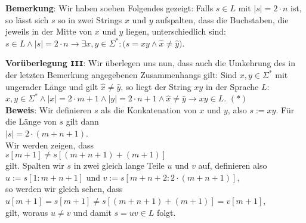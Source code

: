 \noindent
\textbf{Bemerkung}: Wir haben soeben Folgendes gezeigt:  Falls $s \in L$ mit $|s| = 2 \cdot n$ ist, so l\"asst
sich $s$ so in zwei Strings $x$ und $y$ aufspalten, dass die Buchstaben, die jeweils in
der Mitte von $x$ und $y$ liegen, unterschiedlich sind:
\\[0.2cm]
\hspace*{1.3cm}
$s \in L \wedge |s| = 2 \cdot n \rightarrow \exists x,y \in \Sigma^*: \bigl(
 s = xy \wedge \hat{x} \not= \hat{y}\bigr)$.
\vspace{0.3cm}

\noindent
\textbf{Vor\"uberlegung \texttt{III}}:
Wir \"uberlegen uns nun, dass auch die Umkehrung des in der letzten Bemerkung angegebenen
Zusammenhangs gilt:  Sind $x, y \in \Sigma^*$ mit ungerader L\"ange und gilt 
$\hat{x} \not= \hat{y}$, so liegt der String $xy$ in der Sprache $L$:
\\[0.2cm]
\hspace*{1.3cm}
$x, y \in \Sigma^* \wedge |x| = 2 \cdot m + 1 \wedge |y| = 2 \cdot n + 1 \wedge \hat{x}
\not= \hat{y} \rightarrow xy \in L$. \hspace*{\fill} $(*)$
\\[0.2cm]

\noindent
\textbf{Beweis}: Wir definieren $s$ als die Konkatenation von $x$ und $y$, also $s := xy$.
F\"ur die L\"ange von $s$ gilt dann
\\[0.2cm]
\hspace*{1.3cm}
$|s| = 2 \cdot (m + n + 1)$.
\\[0.2cm]
Wir werden zeigen, dass
\\[0.2cm]
\hspace*{1.3cm}
$s[m+1] \not= s[(m+n+1) + (m+1)]$
\\[0.2cm]
gilt.  Spalten wir $s$ in zwei gleich lange Teile $u$ und $v$ auf, definieren also 
\\[0.2cm]
\hspace*{1.3cm}
$u := s[1:m+n+1]$ \quad und \quad
$v := s[m+n+2: 2\cdot(m+n+1)]$, 
\\[0.2cm]
so werden wir gleich sehen, dass
\\[0.2cm]
\hspace*{1.3cm}
$u[m+1] = s[m+1] \not= s[(m+n+1) + (m+1)] = v[m+1]$,
\\[0.2cm]
gilt, woraus  $u \not= v$ und damit $s = uv \in L$ folgt. 
\vspace{0.3cm}

